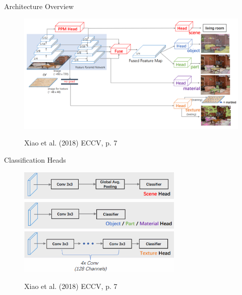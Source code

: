 \documentclass{beamer}
\begin{document}

\begin{frame}{Architecture Overview}
    \begin{figure}
        \centering
        \includegraphics[width=\textwidth]{Images/UPerNetArchitectureOverview_noHeads.png}

        \vspace{0.5em}
        {\tiny Xiao et al. (2018) ECCV, p. 7}
    \end{figure}
\end{frame}


\begin{frame}{Classification Heads}
    \begin{figure}
        \centering
        \includegraphics[width=0.7\textwidth]{Images/ClassifierHeads.png}

        \vspace{0.5em}
        {\tiny Xiao et al. (2018) ECCV, p. 7}
    \end{figure}
\end{frame}

\end{document}
